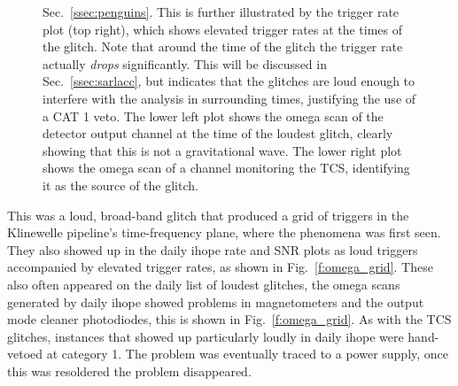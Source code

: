\begin{figure}
{Sec.~\ref{ssec:penguins}.  This is further illustrated by the trigger
rate plot (top right), which shows elevated trigger rates at the times
of the glitch.  Note that around the time of the glitch the trigger
rate actually {\it drops} significantly.  This will be discussed in
Sec.~\ref{ssec:sarlacc}, but indicates that the glitches are loud
enough to interfere with the analysis in surrounding times, justifying
the use of a CAT 1 veto.  The lower left plot shows the omega scan
of the detector output channel at the time of the loudest
glitch, clearly showing that this is not a gravitational wave.  The
lower right plot shows the omega scan of a channel monitoring the TCS,
identifying it as the source of the glitch.}
\end{figure}%



This was a loud, broad-band glitch that produced a grid of triggers in
the Klinewelle pipeline's time-frequency plane, where the phenomena was first
seen.  They also showed up in the daily ihope rate and SNR plots as
loud triggers accompanied by elevated trigger rates, as shown in
Fig.~\ref{f:omega_grid}.  These also often appeared on the
daily list of loudest glitches, the omega scans generated by daily
ihope showed problems in magnetometers and the output mode cleaner
photodiodes, this is shown in Fig.~\ref{f:omega_grid}.  As with the
TCS glitches, instances that showed up particularly loudly in daily
ihope were hand-vetoed at category 1.  The problem was eventually
traced to a power supply, once this was resoldered the problem
disappeared.



